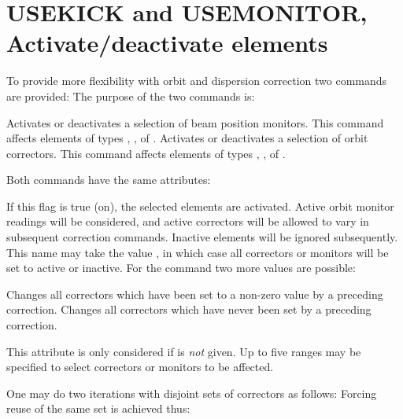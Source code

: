\section{USEKICK and USEMONITOR, Activate/deactivate elements}
\label{S-USECOM}
To provide more flexibility with orbit and dispersion correction two
commands are provided:
The purpose of the two commands is:
\begin{mylist}
Activates or deactivates a selection of beam position monitors.
This command affects elements of types , ,
of .
Activates or deactivates a selection of orbit correctors.
This command affects elements of types , ,
of .
\end{mylist}
Both commands have the same attributes:
\begin{mylist}
If this flag is true (on), the selected elements are activated.
Active orbit monitor readings will be considered,
and active correctors will be allowed to vary in subsequent correction
commands.
Inactive elements will be ignored subsequently.
This name may take the value , in which case all correctors
or monitors will be set to active or inactive.
For the  command two more values are possible:
\begin{mylist}
Changes all correctors which have been set to a non-zero value
by a preceding correction.
Changes all correctors which have never been set by a preceding
correction.
\end{mylist}
This attribute is only considered if  is {\em not} given.
Up to five ranges may be specified to select correctors or monitors to
be affected.
\end{mylist}
One may do two iterations with disjoint sets of correctors as follows:
Forcing reuse of the same set is achieved thus:
 
